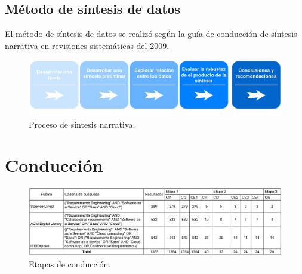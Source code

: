 \documentclass[conference,onecolumn,10pt]{IEEEtran}
\begin{document}
\begin{table}[ht]
        \caption{Criterios para evaluar} 
        \centering 
        \label{table:tablaterminos}
\end{table}

\subsection{Método de síntesis de datos}
El método de síntesis de datos se realizó según la guía de conducción de síntesis narrativa en revisiones
sistemáticas del 2009. 

\begin{figure}[!htb]
   \includegraphics[width=\linewidth]{narrativa.png}
   \caption{Proceso de síntesis narrativa.}
   \label{fig:sistesisnarrativa}
\end{figure}
\newpage

\section{Conducción}
\begin{figure}[!htb]
   \includegraphics[width=\linewidth]{etapas.png}
   \caption{Etapas de conducción.}
   \label{fig:etapasconducción}
\end{figure}
\end{document}
